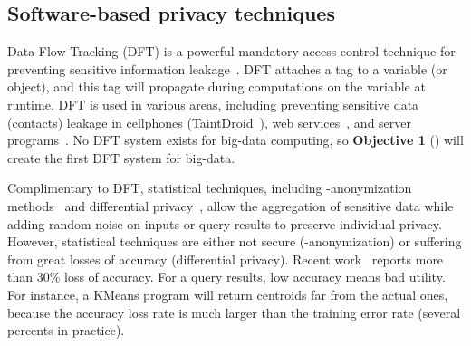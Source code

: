 \vspace{-.15in}\subsection{Software-based privacy techniques}
\label{sec:dft}\vspace{-.075in}

Data Flow Tracking (DFT) is a powerful mandatory access control technique for 
preventing sensitive information leakage~\cite{dawn05:taint}. DFT attaches a 
tag to a variable (or object), and this tag will propagate during computations 
on the variable at runtime. DFT is used in various areas, including 
preventing sensitive data (\eg contacts) leakage in cellphones 
(TaintDroid~\cite{taintdroid:osdi10}), web services~\cite{cloudfence:raid13}, 
and server programs~\cite{libdft:vee12}. No DFT system exists for big-data 
computing, so \textbf{Objective 1} () will create the 
first DFT system for big-data.
 
 


Complimentary to DFT, statistical techniques, including -anonymization 
methods~\cite{kanonymity,icde06:ldiversity} and
differential privacy~\cite{gupt:sigmod12,pinq:sigmod09,airavat:nsdi10}, allow 
the aggregation of sensitive data while adding random noise on inputs or 
query results to preserve individual privacy. However, statistical techniques 
are either not secure (-anonymization) or suffering from great losses 
of accuracy (differential privacy). Recent 
work~\cite{differentialresult:vldb15} reports more than 30\% loss of accuracy. 
For a query results, low accuracy means bad utility. For instance, a 
KMeans program will return centroids far from the actual ones, because the 
accuracy loss rate is much larger than the training error rate (several 
percents in practice).

